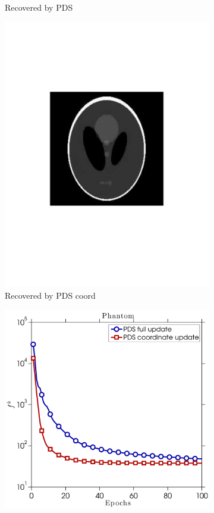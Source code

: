 \begin{figure}[!htb]
\begin{subfigure}{0.45\linewidth}
         \caption{Recovered by PDS}\label{fig:pds_b}		        
    \end{subfigure} %
    \begin{subfigure}{0.45\linewidth}
    	\centering
        \includegraphics[width=0.9\linewidth]{./figs/phantom_pds_coord_img}
         \caption{Recovered by PDS coord}\label{fig:pds_c}		        
    \end{subfigure} %
    \quad
    \begin{subfigure}{0.45\linewidth}
    	\centering
        \includegraphics[width=\linewidth]{./figs/phantom_func_val_cropped}

\end{subfigure}
\end{figure}
